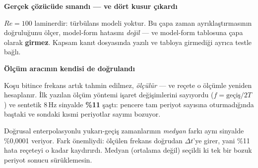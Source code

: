 \documentclass[11pt,a4paper]{article}
\newcommand{\kkkenar}{lacivert}
\newcommand{\kkzemin}{kod}
\newenvironment{renkkutu}[3]{%
  \renewcommand{\kkkenar}{#1}\renewcommand{\kkzemin}{#2}%
  \par\medskip\noindent
  \begin{lrbox}{\kutugovde}%
  \begin{minipage}{\dimexpr\linewidth-2\fboxsep-2\fboxrule\relax}\footnotesize
  \textcolor{#1}{\textbf{#3}}\par\vspace{3pt}%
}{%
  \end{minipage}%
  \end{lrbox}%
  \noindent\fcolorbox{\kkkenar}{\kkzemin}{\usebox{\kutugovde}}%
  \par\medskip
}
\newenvironment{olculdu}[1]{\begin{renkkutu}{iyi}{iyibg}{#1}}{\end{renkkutu}}
\begin{document}
\begin{olculdu}{Gerçek çözücüde sınandı --- ve dört kusur çıkardı}
\noindent $Re=100$ laminerdir: türbülans modeli yoktur. Bu çapa zaman
ayrıklaştırmasının doğruluğunu ölçer, model-form hatasını \emph{değil} --- ve
model-form tablosuna çapa olarak \textbf{girmez}. Kapsam kanıt dosyasında
yazılı ve tabloya girmediği ayrıca testle bağlı.
\end{olculdu}

\begin{olculdu}{Ölçüm aracının kendisi de doğrulandı}
Koşu bitince frekans artık tahmin edilmez, \emph{ölçülür} --- ve reçete o
ölçümle yeniden hesaplanır. İlk yazılan ölçüm yöntemi işaret değişimlerini
sayıyordu ($f = \text{geçiş}/2T$) ve sentetik 8\,Hz sinyalde \textbf{\%11}
şaştı: pencere tam periyot sayısına oturmadığında baştaki ve sondaki kısmi
periyotlar sayımı bozuyor.

Doğrusal enterpolasyonlu yukarı-geçiş zamanlarının \emph{medyan} farkı aynı
sinyalde \%0{,}0001 veriyor. Fark önemliydi: ölçülen frekans doğrudan $\Delta t$'ye
girer, yani \%11 hata reçeteyi o kadar kaydırırdı. Medyan (ortalama değil)
seçildi ki tek bir bozuk periyot sonucu sürüklemesin.
\end{olculdu}
\end{document}
